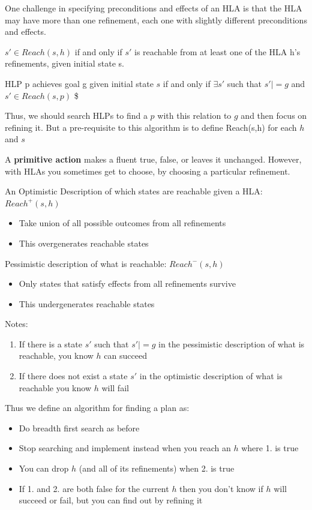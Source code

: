 \documentclass{article}
\begin{document}
One challenge in specifying preconditions and effects of an HLA is that the HLA may have more than one refinement, each one with slightly different preconditions and effects. 

$s' \in Reach(s,h)$ if and only if $s'$ is reachable from at least one of the HLA h's refinements, given initial state s. 

HLP p achieves goal g given initial state $s$ if and only if $\exists s'$ such that $s' |= g$ and $s' \in Reach (s, p)$ \$

Thus, we should search HLPs to find a $p$ with this relation to $g$ and then focus on refining it. But a pre-requisite to this algorithm is to define Reach(s,h) for each $h$ and $s$

A \textbf{primitive action} makes a fluent true, false, or leaves it unchanged. However, with HLAs you sometimes get to choose, by choosing a particular refinement. \newline

An Optimistic Description of which states are reachable given a HLA: $Reach^+(s,h)$
\begin{itemize}
    \item Take union of all possible outcomes from all refinements
    \item This overgenerates reachable states
\end{itemize}

Pessimistic description of what is reachable: $Reach^-(s,h)$
\begin{itemize}
    \item Only states that satisfy effects from all refinements survive
    \item This undergenerates reachable states
\end{itemize}

Notes:
\begin{enumerate}

    \item If there is a state $s'$ such that $s' |= g$ in the pessimistic description of what is reachable, you know $h$ can succeed 
    \item If there does not exist a state $s'$ in the optimistic description of what is reachable you know $h$ will fail

    
\end{enumerate}

Thus we define an algorithm for finding a plan as:
\begin{itemize}
    \item Do breadth first search as before
    \item Stop searching and implement instead when you reach an $h$ where 1. is true
    \item You can drop $h$ (and all of its refinements) when 2. is true
    \item If 1. and 2. are both false for the current $h$ then you don't know if $h$ will succeed or fail, but you can find out by refining it
\end{itemize}
\end{document}
